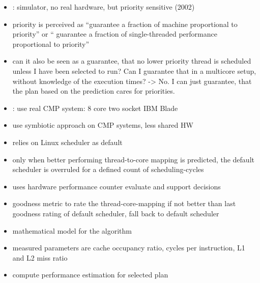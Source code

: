 \begin{itemize}
\begin{itemize}
      \item  \citeauthor{snavely_symbiotic_2002}: simulator, no real hardware,
	but priority sensitive (2002) \checkmark
      \item priority is perceived as ``guarantee a fraction of machine
	proportional to priority'' or `` guarantee a fraction of
	single-threaded performance proportional to priority'' \checkmark
      \item can it also be seen as a guarantee, that no lower priority thread is
	scheduled unless I have been selected to run? Can I guarantee that in a
	multicore setup, without knowledge of the execution times? -> No.
	I can just guarantee, that the plan based on the prediction cares for
	priorities.

      \item {}: use real CMP system: 8 core two
	socket IBM Blade
      \item use symbiotic approach on CMP systems, less shared HW
      \item relies on Linux scheduler as default
      \item only when better performing thread-to-core mapping is predicted, the
	default scheduler is overruled for a defined count of scheduling-cycles
      \item uses hardware performance counter evaluate and support decisions
      \item goodness metric to rate the thread-core-mapping if not better than
	last goodness rating of default scheduler, fall back to default
	scheduler
      \item mathematical model for the algorithm
      \item measured parameters are cache occupancy ratio, cycles per
	instruction, L1	and L2 miss ratio
      \item compute performance estimation for selected plan


\end{itemize}
\end{itemize}
